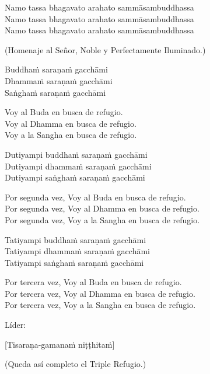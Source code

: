 Namo tassa bhagavato arahato sammāsambuddhassa\\
Namo tassa bhagavato arahato sammāsambuddhassa\\
Namo tassa bhagavato arahato sammāsambuddhassa

\begin{english}
  (Homenaje al Señor, Noble y Perfectamente Iluminado.)\\
\end{english}

Buddhaṁ saraṇaṁ gacchāmi\\
Dhammaṁ saraṇaṁ gacchāmi\\
Saṅghaṁ saraṇaṁ gacchāmi

\begin{english}
  Voy al Buda en busca de refugio.\\
  Voy al Dhamma en busca de refugio.\\
  Voy a la Sangha en busca de refugio.
\end{english}

Dutiyampi buddhaṁ saraṇaṁ gacchāmi\\
Dutiyampi dhammaṁ saraṇaṁ gacchāmi\\
Dutiyampi saṅghaṁ saraṇaṁ gacchāmi

\begin{english}
 Por segunda vez, Voy al Buda en busca de refugio.\\
 Por segunda vez, Voy al Dhamma en busca de refugio.\\
 Por segunda vez, Voy a la Sangha en busca de refugio.
\end{english}

Tatiyampi buddhaṁ saraṇaṁ gacchāmi\\
Tatiyampi dhammaṁ saraṇaṁ gacchāmi\\
Tatiyampi saṅghaṁ saraṇaṁ gacchāmi

\clearpage

\begin{english}
 Por tercera vez, Voy al Buda en busca de refugio.\\
 Por tercera vez, Voy al Dhamma en busca de refugio.\\
 Por tercera vez, Voy a la Sangha en busca de refugio.
\end{english}

\begin{instruction}
  Líder:
\end{instruction}

[Tisaraṇa-gamanaṁ niṭṭhitaṁ]

\begin{english}
  (Queda así completo el Triple Refugio.)
\end{english}


